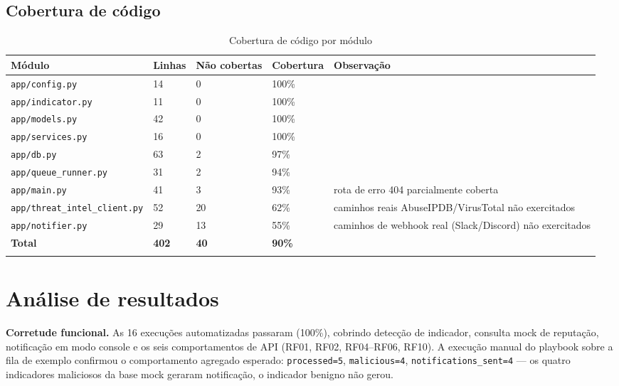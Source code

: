 \documentclass[11pt,a4paper]{article}
\begin{document}
\subsection{Cobertura de código}

\begin{longtable}{p{4.6cm}p{1.6cm}p{1.6cm}p{1.6cm}p{4cm}}
\toprule
\textbf{Módulo} & \textbf{Linhas} & \textbf{Não cobertas} & \textbf{Cobertura} & \textbf{Observação} \\
\midrule
\endhead
\texttt{app/config.py} & 14 & 0 & 100\% & \\
\texttt{app/indicator.py} & 11 & 0 & 100\% & \\
\texttt{app/models.py} & 42 & 0 & 100\% & \\
\texttt{app/services.py} & 16 & 0 & 100\% & \\
\texttt{app/db.py} & 63 & 2 & 97\% & \\
\texttt{app/queue\_runner.py} & 31 & 2 & 94\% & \\
\texttt{app/main.py} & 41 & 3 & 93\% & rota de erro 404 parcialmente coberta \\
\texttt{app/threat\_intel\_client.py} & 52 & 20 & 62\% & caminhos reais AbuseIPDB/VirusTotal não exercitados \\
\texttt{app/notifier.py} & 29 & 13 & 55\% & caminhos de webhook real (Slack/Discord) não exercitados \\
\midrule
\textbf{Total} & \textbf{402} & \textbf{40} & \textbf{90\%} & \\
\bottomrule
\caption{Cobertura de código por módulo}
\end{longtable}

\section{Análise de resultados}
\label{sec:resultados}

\textbf{Corretude funcional.} As 16 execuções automatizadas passaram (100\%), cobrindo
detecção de indicador, consulta mock de reputação, notificação em modo console e os
seis comportamentos de API (RF01, RF02, RF04--RF06, RF10). A execução manual do
playbook sobre a fila de exemplo confirmou o comportamento agregado esperado:
\texttt{processed=5}, \texttt{malicious=4}, \texttt{notifications\_sent=4} --- os quatro
indicadores maliciosos da base mock geraram notificação, o indicador benigno não gerou.
\end{document}
